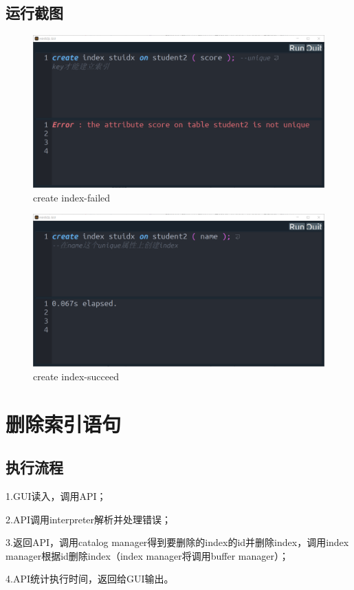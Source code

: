 \documentclass[UTF8]{ctexrep} %
\begin{document}
\subsection{运行截图}
\begin{figure}[H]
    \centering
    \includegraphics[width=0.8\linewidth]{figure/3.1.png}
    \caption{create index-failed}
    \label{fig:runtime3.1}
\end{figure}
\begin{figure}[H]
    \centering
    \includegraphics[width=0.8\linewidth]{figure/3.2.png}
    \caption{create index-succeed}
    \label{fig:runtime3.2}
\end{figure}
\section{删除索引语句}
\subsection{执行流程}
1.GUI读入，调用API；
\par
2.API调用interpreter解析并处理错误；
\par
3.返回API，调用catalog manager得到要删除的index的id并删除index，调用index manager根据id删除index（index manager将调用buffer manager）；
\par
4.API统计执行时间，返回给GUI输出。
\end{document}
